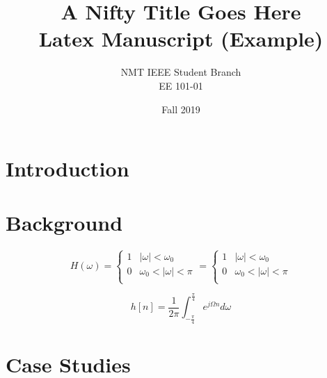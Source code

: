 \documentclass[12pt]{article}
\title{\LARGE \textbf{A Nifty Title Goes Here} 
        \\ Latex Manuscript (Example)}
\author{NMT IEEE Student Branch
        \\ EE 101-01}
\date{Fall 2019}
\begin{document}
\maketitle

\begin{abstract}
    \lipsum[1]
\end{abstract}

\newpage

\tableofcontents
\listoffigures
\listoftables

\newpage

\section*{Introduction}
\lipsum[2]
 
\section{Background}
\lipsum[3-4]

\begin{equation}\label{eq_1}
  H(\omega) =
  \begin{cases}
   1 & |\omega| < \omega_0 \\
   0 & \omega_0 < |\omega| < \pi \\
  \end{cases}
  =
    \begin{cases}
   1 & |\omega| < \omega_0 \\
   0 & \omega_0 < |\omega| < \pi \\
  \end{cases}
\end{equation}

\lipsum[5]

\begin{equation}\label{eq:2}
    h[n] = \frac{1}{2\pi} \int_{-\frac{\pi}{4}}^{\frac{\pi}{4}} e^{j\Omega n} d\omega
\end{equation} 



\section{Case Studies}
\lipsum[6]
\end{document}
